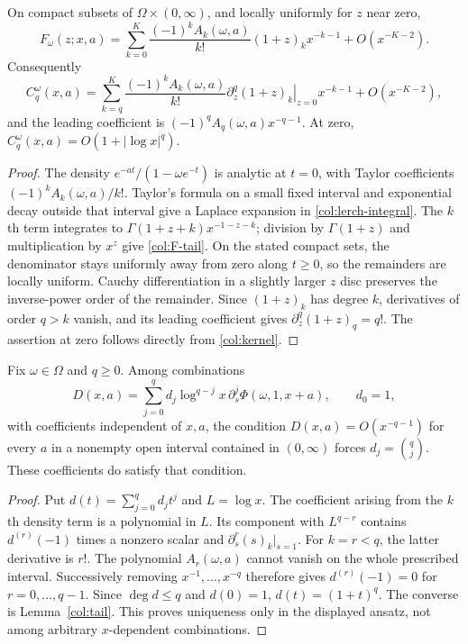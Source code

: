 \begin{lemma}\label{col:tail}
On compact subsets of $\Omega\times(0,\infty)$, and locally uniformly
for $z$ near zero,
\begin{equation}\label{col:F-tail}
 F_\omega(z;x,a)=
  \sum_{k=0}^{K}\frac{(-1)^k A_k(\omega,a)}{k!}
           (1+z)_k x^{-k-1}+O(x^{-K-2}).
\end{equation}
Consequently
\begin{equation}\label{col:C-tail}
 C_q^\omega(x,a)=
  \sum_{k=q}^{K}\frac{(-1)^k A_k(\omega,a)}{k!}
   \left.\partial_z^q(1+z)_k\right|_{z=0}x^{-k-1}
       +O(x^{-K-2}),
\end{equation}
and the leading coefficient is
$(-1)^q A_q(\omega,a)x^{-q-1}$.
At zero, $C_q^\omega(x,a)=O(1+|\log x|^q)$.
\end{lemma}

\begin{proof}
The density $e^{-at}/(1-\omega e^{-t})$ is analytic at $t=0$,
with Taylor coefficients $(-1)^k A_k(\omega,a)/k!$.
Taylor's formula on a small fixed interval and exponential decay
outside that interval give a Laplace expansion in
\eqref{col:lerch-integral}. The $k$th term integrates to
$\Gamma(1+z+k)x^{-1-z-k}$; division by $\Gamma(1+z)$
and multiplication by $x^z$ give \eqref{col:F-tail}.
On the stated compact sets, the denominator stays uniformly away
from zero along $t\ge0$, so the remainders are locally uniform.
Cauchy differentiation in a slightly larger $z$ disc preserves
the inverse-power order of the remainder. Since $(1+z)_k$ has
degree $k$, derivatives of order $q>k$ vanish, and its leading
coefficient gives $\partial_z^q(1+z)_q=q!$.
The assertion at zero follows directly from \eqref{col:kernel}.
\end{proof}

\begin{theorem}\label{col:unique}
Fix $\omega\in\Omega$ and $q\ge0$. Among combinations
\[
 D(x,a)=\sum_{j=0}^q d_j\log^{q-j}x\,
                  \partial_s^j\Phi(\omega,1,x+a),\qquad d_0=1,
\]
with coefficients independent of $x,a$, the condition
$D(x,a)=O(x^{-q-1})$ for every $a$ in a nonempty open interval contained in $(0,\infty)$
forces $d_j=\binom qj$. These coefficients do satisfy that condition.
\end{theorem}

\begin{proof}
Put $d(t)=\sum_{j=0}^q d_jt^j$ and $L=\log x$.
The coefficient arising from the $k$th density term is a polynomial
in $L$. Its component with $L^{q-r}$ contains
$d^{(r)}(-1)$ times a nonzero scalar and
$\partial_s^r(s)_k|_{s=1}$. For $k=r<q$, the latter derivative
is $r!$. The polynomial $A_r(\omega,a)$ cannot vanish on the
whole prescribed interval. Successively removing $x^{-1},\ldots,x^{-q}$
therefore gives $d^{(r)}(-1)=0$ for $r=0,\ldots,q-1$.
Since $\deg d\le q$ and $d(0)=1$, $d(t)=(1+t)^q$.
The converse is Lemma~\ref{col:tail}. This proves uniqueness only
in the displayed ansatz, not among arbitrary $x$-dependent combinations.
\end{proof}

